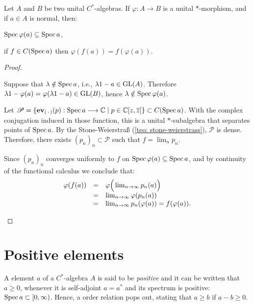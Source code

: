 \begin{proposicao}
Let ${A}$ and ${B}$ be two unital $C^{*}$-algebras. If $\varphi: {A} \longrightarrow {B}$ is a unital $*$-morphism, and if $a \in {A}$ is normal, then:
\begin{itroman}
\item \label{prop item: Spec varphi(a) subset Spec a}$\operatorname{Spec} \varphi(a) \subseteq \operatorname{Spec} a$,
\item if $f \in C(\operatorname{Spec} a)$ then $\varphi(f(a))=f(\varphi(a))$.
\end{itroman}
\end{proposicao}
\begin{proof}$\left.\right.$
\begin{itroman}
\item Suppose that $\lambda \notin \operatorname{Spec} a$, i.e., $\lambda 1- a\in \operatorname{GL}(A)$. Therefore $\lambda1-\varphi(a) = \varphi(\lambda1-a) \in \operatorname{GL}(B)$, hence $\lambda \notin \operatorname{Spec} \varphi(a)$.

\item Let $\mathscr P = \{ \boldsymbol{\operatorname{ev}}_{(\operatorname{\,\cdot\,})}(p) : \operatorname{Spec} a \longrightarrow \operatorname{\mathbb{C}} \mid p \in \operatorname{\mathbb{C}}[z,\overline{z}]\} \subset C(\operatorname{Spec} a)$. With the complex conjugation induced in those function, this is a unital $*$-subalgebra that separates points of $\operatorname{Spec} a$. By the Stone-Weierstra\ss\,\,(\ref{teo: stone-weierstrass}), $\mathscr P$ is dense. Therefore, there exists $(p_n)_n \subset \mathscr P$ such that $f=\lim_n p_n$. 

Since $(p_n)_n$ converges uniformly to $f$ on $\operatorname{Spec} \varphi(a) \subseteq \operatorname{Spec} a$, and by continuity of the functional calculus we conclude that:
\begin{equation*}
    \begin{array}{rcl}
        \varphi(f(a)) &=& \varphi\Big(\lim_{n\to\infty} p_n(a)\Big) \\&=& \lim_{n\to\infty} \varphi(p_n(a)) \\&=&  \lim_{n\to\infty} p_n(\varphi(a)) = f(\varphi(a)). \qedhere
    \end{array}
\end{equation*}
\end{itroman}
\end{proof}

\section{Positive elements}

\begin{definicao}
A element $a$ of a $C^*$-algebra $A$ is said to be \textit{positive} and it can be written that $a \geq 0$, whenever it is self-adjoint $a=a^*$ and its spectrum is positive: $\operatorname{Spec} a \subset [0,\infty)$. Hence, a order relation pops out, stating that $a\geq b$ if $a -b \geq 0$.
\end{definicao}

